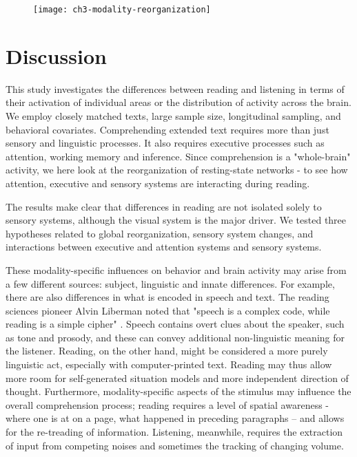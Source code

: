 \begin{figure}[t]
	\centering
	\texttt{[image: ch3-modality-reorganization]}
    \caption[Reading decreases connectivity within visual and dorsal attention networks.]{}
	\label{fig:ch3-modality-reorganization}
\end{figure}


\section{Discussion}

This study investigates the differences between reading and listening in terms of their activation of individual areas or the distribution of activity across the brain. We employ closely matched texts, large sample size, longitudinal sampling, and behavioral covariates. Comprehending extended text requires more than just sensory and linguistic processes. It also requires executive processes such as attention, working memory and inference. Since comprehension is a "whole-brain" activity, we here look at the reorganization of resting-state networks - to see how attention, executive and sensory systems are interacting during reading.

The results make clear that differences in reading are not isolated solely to sensory systems, although the visual system is the major driver. We tested three hypotheses related to global reorganization, sensory system changes, and interactions between executive and attention systems and sensory systems.

These modality-specific influences on behavior and brain activity may arise from a few different sources: subject, linguistic and innate differences. For example, there are also differences in what is encoded in speech and text. The reading sciences pioneer Alvin Liberman noted that "speech is a complex code, while reading is a simple cipher" \cite{Mattingly1971}. Speech contains overt clues about the speaker, such as tone and prosody, and these can convey additional non-linguistic meaning for the listener. Reading, on the other hand, might be considered a more purely linguistic act, especially with computer-printed text. Reading may thus allow more room for self-generated situation models and more independent direction of thought. Furthermore, modality-specific aspects of the stimulus may influence the overall comprehension process; reading requires a level of spatial awareness -where one is at on a page, what happened in preceding paragraphs – and allows for the re-treading of information. Listening, meanwhile, requires the extraction of input from competing noises and sometimes the tracking of changing volume. 

